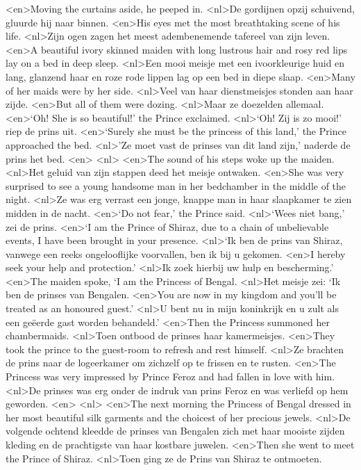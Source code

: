 <en>Moving the curtains aside, he peeped in.
<nl>De gordijnen opzij schuivend,  gluurde hij  naar binnen.
<en>His eyes met the most breathtaking scene of his life.
<nl>Zijn ogen zagen het meest adembenemende tafereel van zijn leven.
<en>A beautiful ivory skinned maiden with long lustrous hair and rosy red lips lay on a bed in deep sleep.
<nl>Een mooi meisje met een ivoorkleurige huid en lang, glanzend haar en roze rode lippen lag op een bed in diepe slaap.
<en>Many of her maids were by her side.
<nl>Veel van haar dienstmeisjes stonden aan haar zijde.
<en>But all of them were dozing.
<nl>Maar ze doezelden allemaal.
<en>`Oh! She is so beautiful!' the Prince exclaimed.
<nl>`Oh! Zij is zo mooi!' riep de prins uit.
<en>`Surely she must be the princess of this land,' the Prince approached the bed.
<nl>'Ze moet vast de prinses van dit land zijn,' naderde de prins het bed.
<en>
<nl>
<en>The sound of his steps woke up the maiden.
<nl>Het geluid van zijn stappen deed het meisje ontwaken.
<en>She was very surprised to see a young handsome man in her bedchamber in the middle of the night.
<nl>Ze was erg verrast een jonge, knappe man  in haar slaapkamer te zien midden in de nacht.
<en>`Do not fear,' the Prince said.
<nl>`Wees niet bang,' zei de prins.
<en>`I am the Prince of Shiraz, due to a chain of unbelievable events, I have been brought in your presence.
<nl>`Ik ben de prins van Shiraz, vanwege een reeks ongelooflijke voorvallen, ben ik bij u gekomen.
<en>I hereby seek your help and protection.'
<nl>Ik zoek hierbij uw hulp en bescherming.'
<en>The maiden spoke, `I am the Princess of Bengal.
<nl>Het meisje zei: `Ik ben de prinses van Bengalen.
<en>You are now in my kingdom and you'll be treated as an honoured guest.'
<nl>U bent nu in mijn koninkrijk en u zult als een geëerde gast worden behandeld.'
<en>Then the Princess summoned her chambermaids.
<nl>Toen ontbood de prinses haar kamermeisjes.
<en>They took the prince to the guest-room to refresh and rest himself.
<nl>Ze brachten de prins naar de logeerkamer om zichzelf op te frissen en te rusten.
<en>The Princess was very impressed by Prince Feroz and had fallen in love with him.
<nl>De prinses was erg onder de indruk van prins Feroz en was verliefd op hem geworden.
<en>
<nl>
<en>The next morning the Princess of Bengal dressed in her most beautiful silk garments and the choicest of her precious jewels.
<nl>De volgende ochtend kleedde de prinses van Bengalen zich met haar mooiste zijden kleding en de prachtigste van haar kostbare juwelen.
<en>Then she went to meet the Prince of Shiraz.
<nl>Toen ging ze de Prins van Shiraz te ontmoeten.
